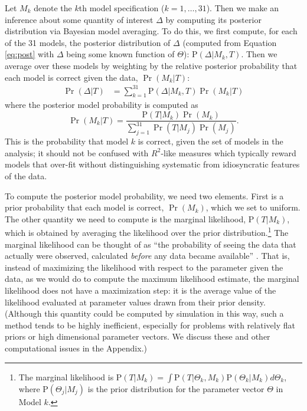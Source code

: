 \documentclass[11pt,titlepage]{article}
\renewcommand{\P}{\text{P}}
\begin{document}
Let $M_k$ denote the $k$th model specification ($k=1,\dots,31$). Then
we make an inference about some quantity of interest $\Delta$ by
computing its posterior distribution via Bayesian model averaging.  To
do this, we first compute, for each of the 31 models, the posterior
distribution of $\Delta$ (computed from Equation \ref{eq:post} with
$\Delta$ being some known function of $\Theta$): $\P(\Delta|M_k,T)$.
Then we average over these models by weighting by the relative
posterior probability that each model is correct given the data,
$\Pr(M_k|T)$:
\begin{align} \label{eq:bma}
  \Pr(\Delta|T) %
                &= \sum_{k=1}^{31} \P(\Delta|M_k,T) \Pr(M_k|T)
\end{align}
where the posterior model probability is computed as
\begin{equation}
  \Pr(M_k|T)=\frac{\P(T|M_k)\Pr(M_k)}
             {\sum_{j=1}^{31} \Pr(T|M_j) \Pr(M_j)}.  \label{eq:postmodel}
\end{equation}
This is the probability that model $k$ is correct, given the set of
models in the analysis; it should not be confused with $R^2$-like
measures which typically reward models that over-fit without
distinguishing systematic from idiosyncratic features of the data.

To compute the posterior model probability, we need two elements.
First is a prior probability that each model is correct, $\Pr(M_k)$,
which we set to uniform.  The other quantity we need to compute is the
marginal likelihood, $\P(T|M_k)$, which is obtained by averaging the
likelihood over the prior distribution.\footnote{\label{eq:marglik}The
  marginal likelihood is $\P(T|M_k) = \int \P(T|\Theta_k, M_k)
  \P(\Theta_k|M_k) d\Theta_k$, where $\P(\Theta_j|M_j)$ is the prior
  distribution for the parameter vector $\Theta$ in Model $k$.}  The
marginal likelihood can be thought of as ``the probability of seeing
the data that actually were observed, calculated \emph{before} any
data became available'' \cite[p.776]{kass:raft:95}.  That is, instead
of maximizing the likelihood with respect to the parameter given the
data, as we would do to compute the maximum likelihood estimate, the
marginal likelihood does not have a maximization step: it is the
average value of the likelihood evaluated at parameter values drawn
from their prior density.  (Although this quantity could be computed
by simulation in this way, such a method tends to be highly
inefficient, especially for problems with relatively flat priors or
high dimensional parameter vectors.  We discuss these and other
computational issues in the Appendix.)
\end{document}
